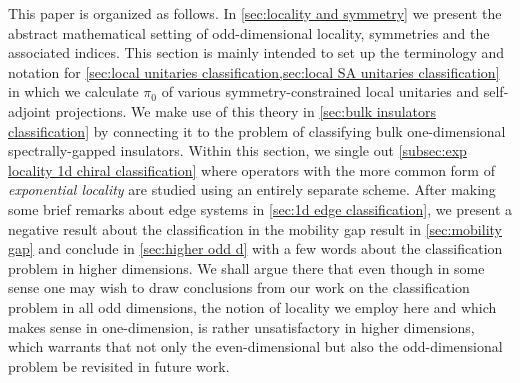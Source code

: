 \documentclass[a4paper,10pt]{article}
\numberwithin{equation}{section}
\theoremstyle{plain}
\theoremstyle{plain}
\theoremstyle{plain}
\theoremstyle{plain}
\theoremstyle{plain}
\theoremstyle{remark}
\theoremstyle{definition}
\theoremstyle{plain}
\begin{document}
	This paper is organized as follows. In \cref{sec:locality and symmetry} we present the abstract mathematical setting of odd-dimensional locality, symmetries and the associated indices. This section is mainly intended to set up the terminology and notation for \cref{sec:local unitaries classification,sec:local SA unitaries classification} in which we calculate $\pi_0$ of various symmetry-constrained local unitaries and self-adjoint projections. We make use of this theory in \cref{sec:bulk insulators classification} by connecting it to the problem of classifying bulk one-dimensional spectrally-gapped insulators. Within this section, we single out \cref{subsec:exp locality 1d chiral classification} where operators with the more common form of \emph{exponential locality} are studied using an entirely separate scheme. After making some brief remarks about edge systems in \cref{sec:1d edge classification}, we present a negative result about the classification in the mobility gap result in \cref{sec:mobility gap} and conclude in \cref{sec:higher odd d} with a few words about the classification problem in higher dimensions. We shall argue there that even though in some sense one may wish to draw conclusions from our work on the classification problem in all odd dimensions, the notion of locality we employ here and which makes sense in one-dimension, is rather unsatisfactory in higher dimensions, which warrants that not only the even-dimensional but also the odd-dimensional problem be revisited in future work.
	
\end{document}
